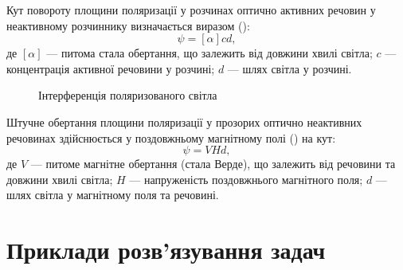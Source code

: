 Кут повороту площини поляризації у розчинах оптично активних
речовин у неактивному розчиннику визначається виразом ():
\begin{equation}\label{eq:Bio}
    \psi = [\alpha] cd,
\end{equation}
де $ [\alpha] $ --- питома стала обертання, що залежить від довжини хвилі світла; $ c $ --- концентрація активної речовини у розчині; $ d $ --- шлях світла у розчині.

\begin{figure}[h!]\centering

\caption{Інтерференція поляризованого світла}
\label{pic:polarisation_plane_rotation}
\end{figure}

Штучне обертання площини поляризації у прозорих оптично
неактивних речовинах здійснюється у поздовжньому магнітному полі
() на кут:
\begin{equation}\label{eq:Faraday_effect}
    \psi = VHd,
\end{equation}
де $ V $ --- питоме магнітне обертання (стала Верде), що залежить від речовини
та довжини хвилі світла; $ H $ --- напруженість поздовжнього магнітного поля;
$ d $ --- шлях світла у магнітному поля та речовині.



\section{Приклади розв’язування задач}


